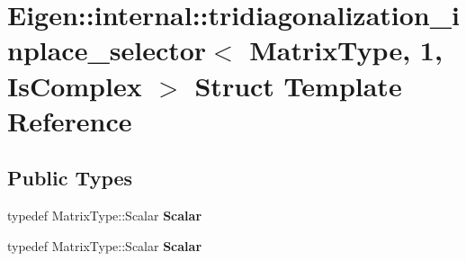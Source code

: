 \hypertarget{struct_eigen_1_1internal_1_1tridiagonalization__inplace__selector_3_01_matrix_type_00_011_00_01_is_complex_01_4}{}\section{Eigen\+:\+:internal\+:\+:tridiagonalization\+\_\+inplace\+\_\+selector$<$ Matrix\+Type, 1, Is\+Complex $>$ Struct Template Reference}
\label{struct_eigen_1_1internal_1_1tridiagonalization__inplace__selector_3_01_matrix_type_00_011_00_01_is_complex_01_4}
\subsection*{Public Types}
\begin{DoxyCompactItemize}
\item 
\mbox{\label{struct_eigen_1_1internal_1_1tridiagonalization__inplace__selector_3_01_matrix_type_00_011_00_01_is_complex_01_4_a553cc701f0e55f0de7408d4ea093a7b4}} 
typedef Matrix\+Type\+::\+Scalar {\bfseries Scalar}
\item 
\mbox{\label{struct_eigen_1_1internal_1_1tridiagonalization__inplace__selector_3_01_matrix_type_00_011_00_01_is_complex_01_4_a553cc701f0e55f0de7408d4ea093a7b4}} 
typedef Matrix\+Type\+::\+Scalar {\bfseries Scalar}
\end{DoxyCompactItemize}
